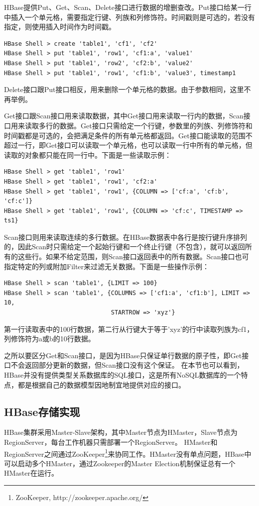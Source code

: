 HBase提供Put、Get、Scan、Delete接口进行数据的增删查改。Put接口给某一行中插入一个单元格，需要指定行键、列族和列修饰符。时间戳则是可选的，若没有指定，则使用插入时间作为时间戳。
\begin{lstlisting}
HBase Shell > create 'table1', 'cf1', 'cf2'
HBase Shell > put 'table1', 'row1', 'cf1:a', 'value1'
HBase Shell > put 'table1', 'row2', 'cf2:b', 'value2'
HBase Shell > put 'table1', 'row1', 'cf1:b', 'value3', timestamp1
\end{lstlisting}

Delete接口跟Put接口相反，用来删除一个单元格的数据。由于参数相同，这里不再举例。

Get接口跟Scan接口用来读取数据，其中Get接口用来读取一行内的数据，Scan接口用来读取多行的数据。Get接口只需给定一个行键，参数里的列族、列修饰符和时间戳都是可选的，会把满足条件的所有单元格都返回。Get接口能读取的范围不超过一行，即Get接口可以读取一个单元格，也可以读取一行中所有的单元格，但读取的对象都只能在同一行中。下面是一些读取示例：
\begin{lstlisting}
HBase Shell > get 'table1', 'row1'
HBase Shell > get 'table1', 'row1', 'cf2:a'
HBase Shell > get 'table1', 'row1', {COLUMN => ['cf:a', 'cf:b', 'cf:c']}
HBase Shell > get 'table1', 'row1', {COLUMN => 'cf:c', TIMESTAMP => ts1}
\end{lstlisting}

Scan接口则用来读取连续的多行数据。在HBase数据表中各行是按行键升序排列的，因此Scan时只需给定一个起始行键和一个终止行键（不包含），就可以返回所有的这些行。如果不给定范围，则Scan接口返回表中的所有数据。Scan接口也可指定特定的列或附加Filter来过滤无关数据。下面是一些操作示例：
\begin{lstlisting}
HBase Shell > scan 'table1', {LIMIT => 100}
HBase Shell > scan 'table1', {COLUMNS => ['cf1:a', 'cf1:b'], LIMIT => 10,
                              STARTROW => 'xyz'}
\end{lstlisting}
第一行读取表中的100行数据，第二行从行键大于等于'xyz'的行中读取列族为cf1，列修饰符为a或b的10行数据。

之所以要区分Get和Scan接口，是因为HBase只保证单行数据的原子性，即Get接口不会返回部分更新的数据，但Scan接口没有这个保证。
在本节也可以看到，HBase并没有提供类型关系数据库的SQL接口，这是所有NoSQL数据库的一个特点，都是根据自己的数据模型因地制宜地提供对应的接口。


\subsection{HBase存储实现}
HBase集群采用Master-Slave架构，其中Master节点为HMaster，Slave节点为RegionServer，每台工作机器只需部署一个RegionServer。
HMaster和RegionServer之间通过ZooKeeper\footnote{ZooKeeper, http://zookeeper.apache.org/}来协同工作。HMaster没有单点问题，HBase中可以启动多个HMaster，通过Zookeeper的Master Election机制保证总有一个HMaster在运行。


